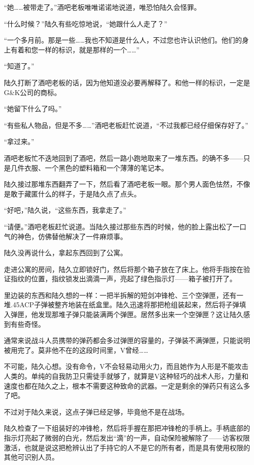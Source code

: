 “她……被带走了。”酒吧老板唯唯诺诺地说道，唯恐怕陆久会怪罪。

“什么时候？”陆久有些吃惊地说，“她跟什么人走了？”

“一个多月前。那是一些……我也不知道是什么人，不过您也许认识他们。他们的身上有着和您一样的标识，就是那样的一个……”

“知道了。”

陆久打断了酒吧老板的话，因为他知道没必要再解释了。和他一样的标识，一定是G\&K公司的商标。

“她留下什么了吗。”

“有些私人物品，但是不多……”酒吧老板赶忙说道，“不过我都已经仔细保存好了。”

“拿过来。”

酒吧老板忙不迭地回到了酒吧，然后一路小跑地取来了一堆东西。的确不多——只是几件衣服、一个黑色的塑料箱和一个薄薄的笔记本。

陆久接过那堆东西翻弄了一下，然后看了酒吧老板一眼。那个男人面色怯然，不像是敢于藏匿什么的样子，于是陆久点了点头。

“好吧，”陆久说，“这些东西，我拿走了。”

“请便。”酒吧老板赶忙说道。当陆久接过那些东西的时候，他的脸上露出松了一口气的神色，仿佛替他解决了一件麻烦事。

陆久没再说什么，拿起东西回到了公寓。

走进公寓的房间，陆久立即锁好门，然后将那个箱子放在了床上。他将手指按在验证指纹的位置，指纹锁发出滴滴一声，亮起了绿色指示灯——箱子被打开了。

里边装的东西和陆久想的一样：一把半拆解的短剑冲锋枪、三个空弹匣，还有一堆.45ACP子弹被整齐地装在纸盒里。陆久迅速将那把枪组装起来，然后将子弹填入弹匣，他发现那堆子弹只能装满两个弹匣。居然多出来一个空弹匣？这让陆久感到有些奇怪。

通常来说战斗人员携带的弹药都会多过弹匣的容量的，子弹装不满弹匣，只能说明被用完了。莫非他不在的这段时间里，V曾经……

不可能，陆久心想。没有命令，V不会轻易动用火力，而且她作为人形是不能攻击人类的。单纯的自我防卫只需徒手就够了，就算是V这种轻巧的战术人形，力量和速度也都在陆久之上，根本不需要这种致命的武器。一定是剩余的弹药只有这么多了吧。

不过对于陆久来说，这点子弹已经足够，毕竟他不是在战场。

陆久检查了一下组装好的冲锋枪，然后将手握在那把冲锋枪的手柄上。手柄底部的指示灯亮起了微弱的白光，然后发出“滴”的一声，自动保险被解除了——访客权限激活，也就是说这把枪辨认出了手持它的人不是它的所有者，而是具有使用权限的其他可识别人员。

